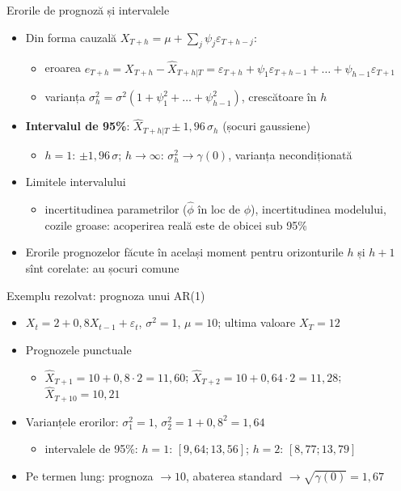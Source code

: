 \begin{frame}{Erorile de prognoză și intervalele}
\itemsize{\small}
\begin{itemize}
    \item Din forma cauzală $X_{T+h} = \mu + \sum_j\psi_j\varepsilon_{T+h-j}$:
    \begin{itemize}
        \item eroarea $e_{T+h} = X_{T+h} - \hat X_{T+h|T} = \varepsilon_{T+h} + \psi_1\varepsilon_{T+h-1} + \dots + \psi_{h-1}\varepsilon_{T+1}$
        \item varianța $\sigma_h^2 = \sigma^2(1 + \psi_1^2 + \dots + \psi_{h-1}^2)$, crescătoare în $h$
    \end{itemize}
    \item \textbf{Intervalul de 95\%}: $\hat X_{T+h|T} \pm 1{,}96\,\sigma_h$ (șocuri gaussiene)
    \begin{itemize}
        \item $h = 1$: $\pm 1{,}96\,\sigma$; $h \to \infty$: $\sigma_h^2 \to \gamma(0)$, varianța necondiționată
    \end{itemize}
    \item Limitele intervalului
    \begin{itemize}
        \item incertitudinea parametrilor ($\hat\phi$ în loc de $\phi$), incertitudinea modelului, cozile groase: acoperirea reală este de obicei sub 95\%
    \end{itemize}
    \item Erorile prognozelor făcute în același moment pentru orizonturile $h$ și $h + 1$ sînt corelate: au șocuri comune
\end{itemize}
\end{frame}

\begin{frame}{Exemplu rezolvat: prognoza unui AR(1)}
\itemsize{\small}
\begin{itemize}
    \item $X_t = 2 + 0{,}8X_{t-1} + \varepsilon_t$, $\sigma^2 = 1$, $\mu = 10$; ultima valoare $X_T = 12$
    \item Prognozele punctuale
    \begin{itemize}
        \item $\hat X_{T+1} = 10 + 0{,}8 \cdot 2 = 11{,}60$; $\hat X_{T+2} = 10 + 0{,}64 \cdot 2 = 11{,}28$; $\hat X_{T+10} = 10{,}21$
    \end{itemize}
    \item Varianțele erorilor: $\sigma_1^2 = 1$, $\sigma_2^2 = 1 + 0{,}8^2 = 1{,}64$
    \begin{itemize}
        \item intervalele de 95\%: $h = 1$: $[9{,}64; 13{,}56]$; $h = 2$: $[8{,}77; 13{,}79]$
    \end{itemize}
    \item Pe termen lung: prognoza $\to 10$, abaterea standard $\to \sqrt{\gamma(0)} = 1{,}67$
\end{itemize}
\end{frame}

